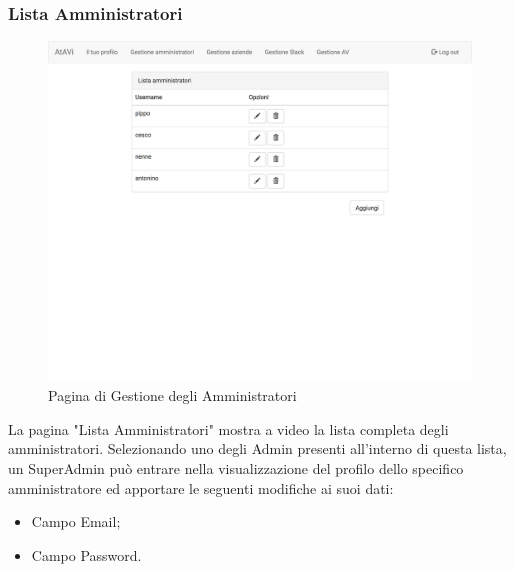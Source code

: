 \documentclass[../ManualeUtente_v1.0.0.tex]{subfiles}
\begin{document}
	\subsubsection{Lista Amministratori}
	\begin{figure}[!h]
		\centering
		\includegraphics[scale=0.15]{Screenshot/admin-manageAdmins.png}
		\caption{Pagina di Gestione degli Amministratori}
	\end{figure}
	La pagina "Lista Amministratori" mostra a video la lista completa degli amministratori. Selezionando uno degli Admin presenti all'interno di questa lista, un SuperAdmin può entrare nella visualizzazione del profilo dello specifico amministratore ed apportare le seguenti modifiche ai suoi dati:
	\begin{itemize}
		\item{Campo Email};
		\item{Campo Password}.
	\end{itemize}
\end{document}

